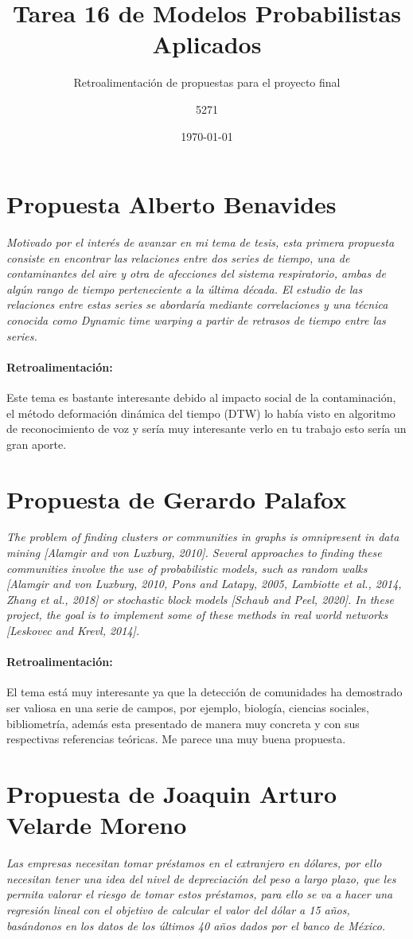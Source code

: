 \documentclass{article}
\title{Tarea 16 de Modelos Probabilistas Aplicados}
\subtitle{Retroalimentación de propuestas para el proyecto final}
\author{5271}
\date{\today}
\begin{document}
\maketitle
\section{Propuesta Alberto Benavides}
\textit{Motivado por el interés de avanzar en mi tema de tesis, esta primera propuesta consiste en encontrar las relaciones entre dos series de tiempo, una de contaminantes del aire y otra de afecciones del sistema respiratorio, ambas de algún rango de tiempo perteneciente a la última década. El estudio de las relaciones entre estas series se abordaría mediante correlaciones y una técnica conocida como \emph{Dynamic time warping} a partir de retrasos de tiempo entre las series.} 
\paragraph{Retroalimentación:}
Este tema es bastante interesante debido al impacto social de la contaminación, el método deformación dinámica del tiempo (DTW) lo había visto en algoritmo de reconocimiento de voz y  sería muy interesante verlo en tu trabajo esto sería un gran aporte.

\section{Propuesta de Gerardo Palafox}
\textit{The problem of finding clusters or communities in graphs is omnipresent in data mining [Alamgir and von Luxburg, 2010]. Several approaches to finding these communities involve the use of probabilistic models, such as random walks [Alamgir and von Luxburg, 2010, Pons and Latapy, 2005, Lambiotte et al., 2014, Zhang et al., 2018] or stochastic block models [Schaub and Peel, 2020]. In these project, the goal is to implement some of these methods in real world networks [Leskovec and Krevl, 2014].}  

\paragraph{Retroalimentación:} El tema está muy interesante ya que la detección de comunidades ha demostrado ser valiosa en una serie de campos, por ejemplo, biología, ciencias sociales, bibliometría, además esta presentado de manera muy concreta y con sus respectivas referencias teóricas. Me parece una  muy buena propuesta.
\section{Propuesta de Joaquin Arturo Velarde Moreno }
\textit{Las empresas necesitan tomar préstamos en el extranjero en dólares, por ello necesitan tener una idea del nivel de depreciación del peso a largo plazo, que les permita valorar el riesgo de tomar estos préstamos, para ello se va a hacer una regresión lineal con el objetivo de calcular el valor del dólar a 15 años, basándonos en los datos de los últimos 40 años dados por el banco de México.} 
\end{document}
